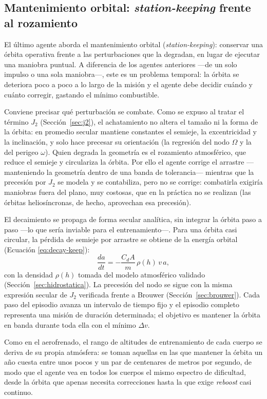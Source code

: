 \subsection{Mantenimiento orbital: \textit{station-keeping} frente al rozamiento}
\label{sec:ia-mantenimiento}

El último agente aborda el mantenimiento orbital (\textit{station-keeping}): conservar una órbita operativa frente a las perturbaciones que la degradan, en lugar de ejecutar una maniobra puntual. A diferencia de los agentes anteriores ---de un solo impulso o una sola maniobra---, este es un problema temporal: la órbita se deteriora poco a poco a lo largo de la misión y el agente debe decidir cuándo y cuánto corregir, gastando el mínimo combustible.

Conviene precisar qué perturbación se combate. Como se expuso al tratar el término $J_2$ (Sección~\ref{sec:j2}), el achatamiento no altera el tamaño ni la forma de la órbita: en promedio secular mantiene constantes el semieje, la excentricidad y la inclinación, y solo hace precesar su orientación (la regresión del nodo $\Omega$ y la del perigeo $\omega$). Quien degrada la geometría es el rozamiento atmosférico, que reduce el semieje y circulariza la órbita. Por ello el agente corrige el arrastre ---manteniendo la geometría dentro de una banda de tolerancia--- mientras que la precesión por $J_2$ se modela y se contabiliza, pero no se corrige: combatirla exigiría maniobras fuera del plano, muy costosas, que en la práctica no se realizan (las órbitas heliosíncronas, de hecho, aprovechan esa precesión).

El decaimiento se propaga de forma secular analítica, sin integrar la órbita paso a paso ---lo que sería inviable para el entrenamiento---. Para una órbita casi circular, la pérdida de semieje por arrastre se obtiene de la energía orbital (Ecuación \ref{eq:decay-keep}):
\begin{equation}
  \frac{da}{dt} = -\frac{C_d A}{m}\,\rho(h)\,v\,a,
  \label{eq:decay-keep}
\end{equation}
con la densidad $\rho(h)$ tomada del modelo atmosférico validado (Sección~\ref{sec:hidrostatica}). La precesión del nodo se sigue con la misma expresión secular de $J_2$ verificada frente a Brouwer (Sección~\ref{sec:brouwer}). Cada paso del episodio avanza un intervalo de tiempo fijo y el episodio completo representa una misión de duración determinada; el objetivo es mantener la órbita en banda durante toda ella con el mínimo $\Delta v$.

Como en el aerofrenado, el rango de altitudes de entrenamiento de cada cuerpo se deriva de su propia atmósfera: se toman aquellas en las que mantener la órbita un año cuesta entre unos pocos y un par de centenares de metros por segundo, de modo que el agente vea en todos los cuerpos el mismo espectro de dificultad, desde la órbita que apenas necesita correcciones hasta la que exige \textit{reboost} casi continuo.


